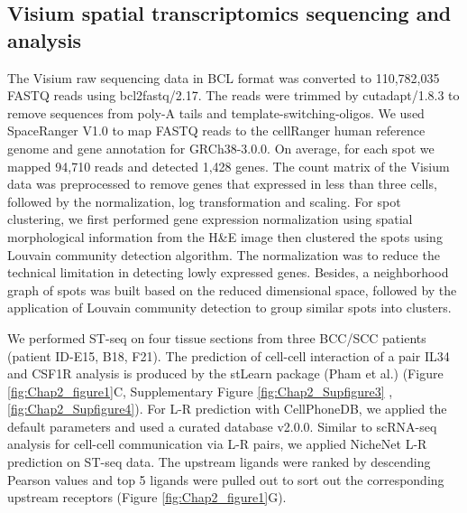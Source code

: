 \subsection{Visium spatial transcriptomics sequencing and analysis}
The Visium raw sequencing data in BCL format was converted to 110,782,035 FASTQ reads using bcl2fastq/2.17. The reads were trimmed by cutadapt/1.8.3 to remove sequences from poly-A tails and template-switching-oligos. We used SpaceRanger V1.0 to map FASTQ reads to the cellRanger human reference genome and gene annotation for GRCh38-3.0.0. On average, for each spot we mapped 94,710 reads and detected 1,428 genes. The count matrix of the Visium data was preprocessed to remove genes that expressed in less than three cells, followed by the normalization, log transformation and scaling. For spot clustering, we first performed gene expression normalization using spatial morphological information from the H\&E image then clustered the spots using Louvain community detection algorithm. The normalization was to reduce the technical limitation in detecting lowly expressed genes. Besides, a neighborhood graph of spots was built based on the reduced dimensional space, followed by the application of Louvain community detection to group similar spots into clusters. 

We performed ST-seq on four tissue sections from three BCC/SCC patients (patient ID-E15, B18, F21). The prediction of cell-cell interaction of a pair IL34 and CSF1R analysis is produced by the stLearn package (Pham et al.) (Figure \ref{fig:Chap2_figure1}C, Supplementary Figure \ref{fig:Chap2_Supfigure3} , \ref{fig:Chap2_Supfigure4}).  For L-R prediction with CellPhoneDB, we applied the default parameters \cite{browaeys2020nichenet, efremova2020cellphonedb}  and used a curated database v2.0.0. Similar to scRNA-seq analysis for cell-cell communication via L-R pairs, we applied NicheNet L-R prediction on ST-seq data. The upstream ligands were ranked by descending Pearson values and top 5 ligands were pulled out to sort out the corresponding upstream receptors (Figure \ref{fig:Chap2_figure1}G). 

